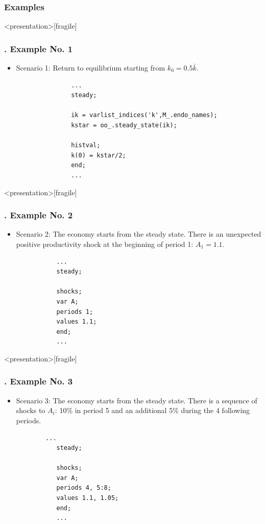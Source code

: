 \documentclass[11pt,aspectratio=169]{beamer}
\begin{document}
\subsubsection{Examples}
\begin{frame}<presentation>[fragile]
	\frametitle{{\thesection.\thesubsection\thinspace\thesubsubsection} Example No. 1}
	\begin{itemize}
		\item Scenario 1: Return to equilibrium starting from $k_0=0.5\bar{k}$.
			\begin{verbatim}
			   ...
			   steady;
			   
			   ik = varlist_indices('k',M_.endo_names);
			   kstar = oo_.steady_state(ik);
			   
			   histval;
			   k(0) = kstar/2;
			   end;
			   ...
			\end{verbatim}
	\end{itemize}
\end{frame}
\begin{frame}<presentation>[fragile]
	\frametitle{{\thesection.\thesubsection\thinspace\thesubsubsection} Example No. 2}
	\begin{itemize}
		\item Scenario 2: The economy starts from the steady state. There is an unexpected positive productivity shock at the beginning of period 1: $A_1 = 1.1$.
		\begin{verbatim}
		   ...
		   steady;
		
		   shocks;
		   var A;
		   periods 1;
		   values 1.1;
		   end;
		   ...
		\end{verbatim}
	\end{itemize}
\end{frame}
\begin{frame}<presentation>[fragile]
	\frametitle{{\thesection.\thesubsection\thinspace\thesubsubsection} Example No. 3}
	\begin{itemize}
		\item Scenario 3: The economy starts from the steady state. There is a sequence of shocks to $A_t$: 10\% in period 5 and an additional 5\% during the 4 following periods.
		\begin{verbatim}
	  	...
		   steady;
		
		   shocks;
		   var A;
		   periods 4, 5:8;
		   values 1.1, 1.05;
		   end;
		   ...
		\end{verbatim}
	\end{itemize}
\end{frame}
\end{document}
